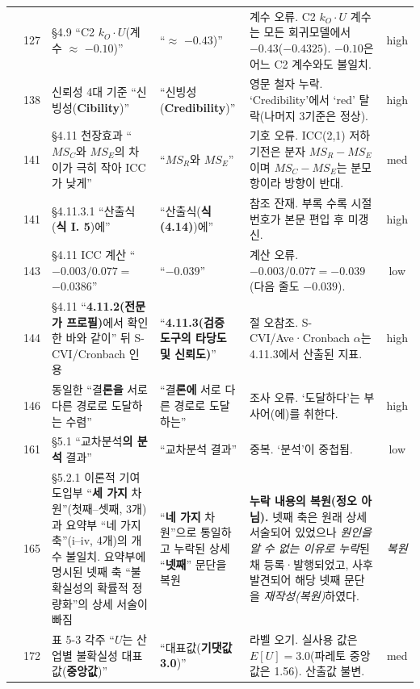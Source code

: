 \documentclass[11pt,a4paper]{article}
\newcommand{\err}[1]{{\color{errred}\textbf{#1}}}
\begin{document}
\begin{longtable}{@{}c c >{\RaggedRight}p{4.6cm} >{\RaggedRight}p{3.0cm} >{\RaggedRight}p{3.4cm} c@{}}
\addlinespace
37 & 127 & \S4.9 ``C2 $k_O\!\cdot\!U$(계수 $\approx$ \err{$-0.10$})'' & ``$\approx$ \err{$-0.43$})'' & 계수 오류. C2 $k_O\!\cdot\!U$ 계수는 모든 회귀모델에서 $-0.43$($-0.4325$). $-0.10$은 어느 C2 계수와도 불일치. & high \\
\addlinespace
38 & 138 & 신뢰성 4대 기준 ``신빙성(\err{Cibility})'' & ``신빙성(\err{Credibility})'' & 영문 철자 누락. `Credibility'에서 `red' 탈락(나머지 3기준은 정상). & high \\
\addlinespace
39 & 141 & \S4.11 천장효과 ``\err{$MS_C$}와 $MS_E$의 차이가 극히 작아 ICC가 낮게'' & ``\err{$MS_R$}와 $MS_E$'' & 기호 오류. ICC(2,1) 저하 기전은 분자 $MS_R-MS_E$이며 $MS_C-MS_E$는 분모 항이라 방향이 반대. & med \\
\addlinespace
40 & 141 & \S4.11.3.1 ``산출식(\err{식 I. 5})에'' & ``산출식(\err{식 (4.14)})에'' & 참조 잔재. 부록 수록 시절 번호가 본문 편입 후 미갱신. & high \\
\addlinespace
41 & 143 & \S4.11 ICC 계산 ``$-0.003/0.077 =$ \err{$-0.0386$}'' & ``\err{$-0.039$}'' & 계산 오류. $-0.003/0.077=-0.039$(다음 줄도 $-0.039$). & low \\
\addlinespace
42 & 144 & \S4.11 ``\err{4.11.2(전문가 프로필)}에서 확인한 바와 같이'' 뒤 S-CVI/Cronbach 인용 & ``\err{4.11.3(검증 도구의 타당도 및 신뢰도)}'' & 절 오참조. S-CVI/Ave·Cronbach $\alpha$는 4.11.3에서 산출된 지표. & high \\
\addlinespace
43 & 146 & 동일한 ``결\err{론을} 서로 다른 경로로 도달하는 수렴'' & ``결\err{론에} 서로 다른 경로로 도달하는'' & 조사 오류. `도달하다'는 부사어(에)를 취한다. & high \\
\addlinespace
44 & 161 & \S5.1 ``교차분석\err{의 분석} 결과'' & ``교차분석 결과'' & 중복. `분석'이 중첩됨. & low \\
\addlinespace
45 & 165 & \S5.2.1 이론적 기여 도입부 ``\err{세 가지} 차원''(첫째--셋째, 3개)과 요약부 ``네 가지 축''(i--iv, 4개)의 개수 불일치. 요약부에 명시된 넷째 축 ``불확실성의 확률적 정량화''의 상세 서술이 빠짐 & ``\err{네 가지} 차원''으로 통일하고 누락된 상세 ``\err{넷째}'' 문단을 복원 & \textbf{누락 내용의 복원(정오 아님).} 넷째 축은 원래 상세 서술되어 있었으나 \emph{원인을 알 수 없는 이유로 누락}된 채 등록·발행되었고, 사후 발견되어 해당 넷째 문단을 \emph{재작성(복원)}하였다. & \emph{복원} \\
\addlinespace
46 & 172 & 표 5-3 각주 ``$U$는 산업별 불확실성 대표값(\err{중앙값})'' & ``대표값(\err{기댓값 3.0})'' & 라벨 오기. 실사용 값은 $E[U]{=}3.0$(파레토 중앙값은 1.56). 산출값 불변. & med \\

\end{longtable}
\end{document}
